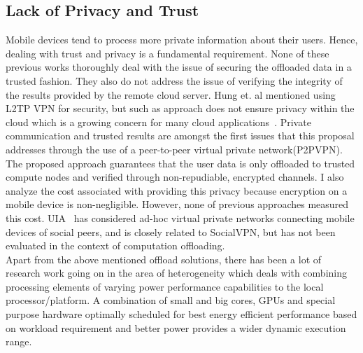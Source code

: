 \subsection{Lack of Privacy and Trust}
\label{intro:lack}
%
Mobile devices tend to process more private information about their
users.
%
Hence, dealing with trust and privacy is a fundamental requirement.
%
None of these previous works thoroughly deal with the issue of securing
the offloaded data in a trusted fashion.
%
They also do not address the issue of verifying the integrity of the
results provided by the remote cloud server.
%
Hung et. al mentioned using L2TP VPN for security, but such as approach
does not ensure privacy within the cloud which is a growing concern for
many cloud applications~\cite{brodkin}.
%
Private communication and trusted results are amongst the first issues
that this proposal addresses through the use of a peer-to-peer virtual
private network(P2PVPN). 
%
The proposed approach guarantees that the user data is only offloaded to
trusted compute nodes and verified through non-repudiable, encrypted
channels.
%
I also analyze the cost associated with providing this privacy because
encryption on a mobile device is non-negligible.
%
However, none of previous approaches measured this cost.
%
UIA~\cite{uia} has considered ad-hoc virtual private networks connecting
mobile devices of social peers, and is closely related to SocialVPN, but
has not been evaluated in the context of computation offloading.\\
%
Apart from the above mentioned offload solutions, there has been a lot
of research work going on in the area of heterogeneity which deals with
combining processing elements of varying power performance capabilities
to the local processor/platform.
%
A combination of small and big cores, GPUs and special purpose hardware
optimally scheduled for best energy efficient performance based on
workload requirement and better power provides a wider dynamic execution
range.
%
